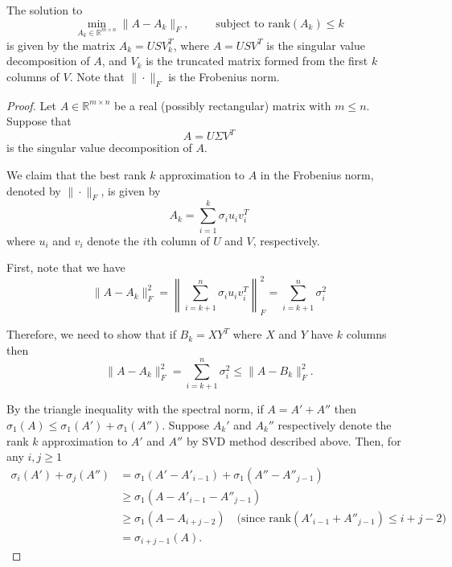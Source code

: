   \begin{theorem}
    The solution to 
    \begin{equation}
      \min_{A_k \in \mathbb{R}^{m \times n}} \| A - A_k \|_F, \qquad \text{ subject to } \mathrm{rank}(A_k) \leq k
    \end{equation} 
    is given by the matrix $A_k = U S V_k^T$, where $A = U S V^T$ is the singular value decomposition of $A$, and $V_k$ is the truncated matrix formed from the first $k$ columns of $V$. Note that $\| \cdot \|_F$ is the Frobenius norm. 
  \end{theorem}
  \begin{proof}
    Let $A \in \mathbb{R}^{m \times n}$ be a real (possibly rectangular) matrix with $m \leq n$. Suppose that
    \begin{equation}
      A = U\Sigma V^T
    \end{equation}
    is the singular value decomposition of $A$.

    We claim that the best rank $k$ approximation to $A$ in the Frobenius norm, denoted by $\| \cdot \|_F$, is given by
    \begin{equation}
      A_k = \sum_{i=1}^k \sigma_i u_i v_i^T
    \end{equation}
    where $u_i$ and $v_i$ denote the $i$th column of $U$ and $V$, respectively.

    First, note that we have
    \begin{equation}
      \|A - A_k\|_F^2 = \left\|\sum_{i=k+1}^n \sigma_i u_i v_i^T\right\|_F^2 = \sum_{i=k+1}^n \sigma_i^2
    \end{equation}

    Therefore, we need to show that if $B_k = XY^T$ where $X$ and $Y$ have $k$ columns then
    \begin{equation}
      \|A - A_k\|_F^2 = \sum_{i=k+1}^n \sigma_i^2 \leq \|A - B_k\|_F^2.
    \end{equation}

    By the triangle inequality with the spectral norm, if $A = A' + A''$ then $\sigma_1(A) \leq \sigma_1(A') + \sigma_1(A'')$. Suppose $A_k'$ and $A_k''$ respectively denote the rank $k$ approximation to $A'$ and $A''$ by SVD method described above. Then, for any $i, j \geq 1$
    \begin{align}
      \sigma_i(A') + \sigma_j(A'') &= \sigma_1(A' - A'_{i-1}) + \sigma_1(A'' - A''_{j-1}) \\
      &\geq \sigma_1(A - A'_{i-1} - A''_{j-1}) \\
      &\geq \sigma_1(A - A_{i+j-2}) \quad \text{(since $\text{rank}(A'_{i-1} + A''_{j-1}) \leq i + j - 2$)} \\
      &= \sigma_{i+j-1}(A).
    \end{align}


\end{proof}
